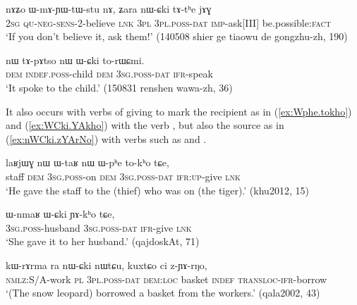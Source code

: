 \begin{exe}
\ex \label{ex:nWCki.tAthe}
\gll nɤʑo ɯ-mɤ-ɲɯ-tɯ-stu nɤ, ʑara nɯ-ɕki tɤ-tʰe jɤɣ \\
\textsc{2sg} \textsc{qu}-\textsc{neg}-\textsc{sens}-2-believe \textsc{lnk} \textsc{3pl} \textsc{3pl}.\textsc{poss}-\textsc{dat} \textsc{imp}-ask[III] be.possible:\textsc{fact} \\
\glt `If you don't believe it, ask them!' (140508 shier ge tiaowu de gongzhu-zh, 190)
\end{exe}

\begin{exe}
\ex \label{ex:WCki.torWCmi}
\gll nɯ tɤ-pɤtso nɯ ɯ-ɕki to-rɯɕmi. \\
\textsc{dem} \textsc{indef}.\textsc{poss}-child \textsc{dem} \textsc{3sg}.\textsc{poss}-\textsc{dat} \textsc{ifr}-speak \\
\glt  `It spoke to the child.' (150831 renshen wawa-zh, 36)
\end{exe}

It also occurs with verbs of giving to mark the recipient as in (\ref{ex:Wphe.tokho}) and (\ref{ex:WCki.YAkho}) with the verb , but also the source as in (\ref{ex:nWCki.zYArNo}) with verbs such as  and .

\begin{exe}
\ex \label{ex:Wphe.tokho}
\gll laʁjɯɣ nɯ ɯ-taʁ nɯ ɯ-pʰe to-kʰo tɕe,  \\
staff \textsc{dem} \textsc{3sg}.\textsc{poss}-on \textsc{dem} \textsc{3sg}.\textsc{poss}-\textsc{dat} \textsc{ifr}:\textsc{up}-give \textsc{lnk} \\
\glt `He gave the staff to the (thief) who was on (the tiger).' (khu2012, 15)
\end{exe}

\begin{exe}
\ex \label{ex:WCki.YAkho}
\gll  ɯ-nmaʁ ɯ-ɕki ɲɤ-kʰo tɕe,  \\
\textsc{3sg}.\textsc{poss}-husband \textsc{3sg}.\textsc{poss}-\textsc{dat} \textsc{ifr}-give \textsc{lnk} \\
\glt `She gave it to her husband.' (qajdoskAt, 71)
\end{exe}

\begin{exe}
\ex \label{ex:nWCki.zYArNo}
\gll 
kɯ-rɤrma ra nɯ-ɕki nɯtɕu, kuxtɕo ci z-ɲɤ-rŋo, \\
\textsc{nmlz}:S/A-work \textsc{pl} \textsc{3pl}.\textsc{poss}-\textsc{dat} \textsc{dem}:\textsc{loc} basket \textsc{indef} \textsc{transloc}-\textsc{ifr}-borrow \\
\glt `(The snow leopard) borrowed a basket from the workers.' (qala2002, 43)
\end{exe}

